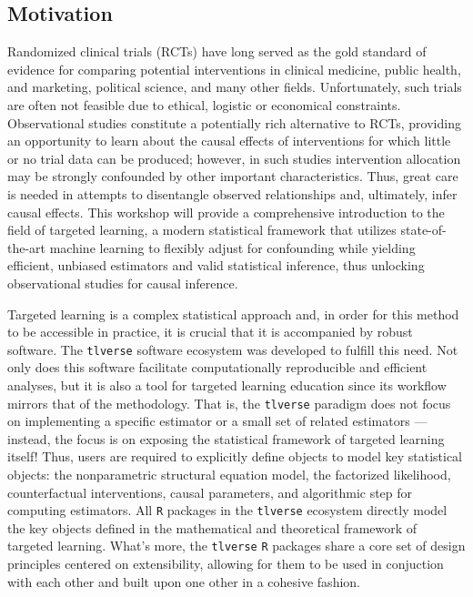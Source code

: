 \documentclass[a4paper,11pt]{texMemo}
\begin{document}
\subsection{Motivation}

Randomized clinical trials (RCTs) have long served as the gold standard of
evidence for comparing potential interventions in clinical medicine, public
health, and marketing, political science, and many other fields. Unfortunately,
such trials are often not feasible due to ethical, logistic or economical
constraints. Observational studies constitute a potentially rich alternative to
RCTs, providing an opportunity to learn about the causal effects of
interventions for which little or no trial data can be produced; however, in
such studies intervention allocation may be strongly confounded by other
important characteristics. Thus, great care is needed in attempts to disentangle
observed relationships and, ultimately, infer causal effects. This workshop will
provide a comprehensive introduction to the field of targeted learning, a modern
statistical framework that utilizes state-of-the-art machine learning to
flexibly adjust for confounding while yielding efficient, unbiased estimators
and valid statistical inference, thus unlocking observational studies for causal
inference.

Targeted learning is a complex statistical approach and, in order for this
method to be accessible in practice, it is crucial that it is accompanied by
robust software. The \texttt{tlverse} software ecosystem was developed to
fulfill this need. Not only does this software facilitate computationally
reproducible and efficient analyses, but it is also a tool for targeted learning
education since its workflow mirrors that of the methodology. That is, the
\texttt{tlverse} paradigm does not focus on implementing a specific estimator or
a small set of related estimators --- instead, the focus is on exposing the
statistical framework of targeted learning itself! Thus, users are required to
explicitly define objects to model key statistical objects: the nonparametric
structural equation model, the factorized likelihood, counterfactual
interventions, causal parameters, and algorithmic step for computing estimators.
All \texttt{R} packages in the \texttt{tlverse} ecosystem directly model the key
objects defined in the mathematical and theoretical framework of targeted
learning. What's more, the \texttt{tlverse} \texttt{R} packages share a core set
of design principles centered on extensibility, allowing for them to be used in
conjuction with each other and built upon one other in a cohesive fashion.
\end{document}
